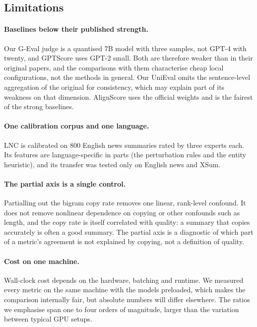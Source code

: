 \subsection{Limitations}

\paragraph{Baselines below their published strength.} Our G-Eval judge is a quantised 7B model with three samples, not GPT-4 with twenty, and GPTScore uses GPT-2 small. Both are therefore weaker than in their original papers, and the comparisons with them characterise cheap local configurations, not the methods in general. Our UniEval omits the sentence-level aggregation of the original for consistency, which may explain part of its weakness on that dimension. AlignScore uses the official weights and is the fairest of the strong baselines.

\paragraph{One calibration corpus and one language.} LNC is calibrated on 800 English news summaries rated by three experts each. Its features are language-specific in parts (the perturbation rules and the entity heuristic), and its transfer was tested only on English news and XSum.

\paragraph{The partial axis is a single control.} Partialling out the bigram copy rate removes one linear, rank-level confound. It does not remove nonlinear dependence on copying or other confounds such as length, and the copy rate is itself correlated with quality: a summary that copies accurately is often a good summary. The partial axis is a diagnostic of which part of a metric's agreement is not explained by copying, not a definition of quality.

\paragraph{Cost on one machine.} Wall-clock cost depends on the hardware, batching and runtime. We measured every metric on the same machine with the models preloaded, which makes the comparison internally fair, but absolute numbers will differ elsewhere. The ratios we emphasise span one to four orders of magnitude, larger than the variation between typical GPU setups.

